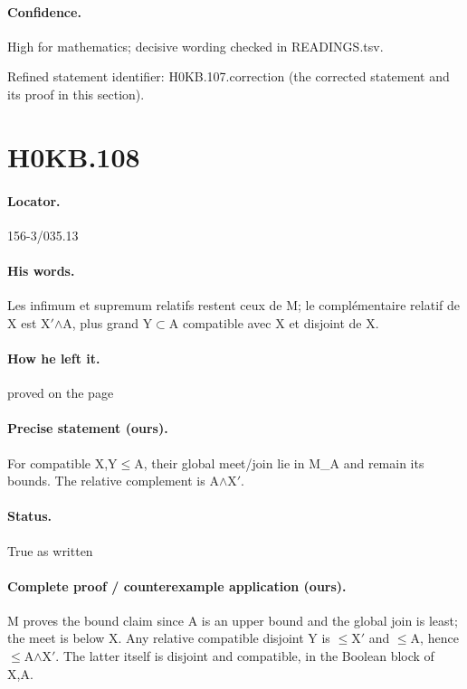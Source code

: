 \paragraph{Confidence.} High for mathematics; decisive wording checked in READINGS.tsv.

\noindent Refined statement identifier: H0KB.107.correction (the corrected statement and its proof in this section).

\section*{H0KB.108}\label{statement:H0KB.108}
\paragraph{Locator.} 156-3/035.13

\paragraph{His words.} Les infimum et supremum relatifs restent ceux de M; le complémentaire relatif de X est X\ensuremath{\prime}\ensuremath{\wedge}A, plus grand Y\ensuremath{\subset}A compatible avec X et disjoint de X.

\paragraph{How he left it.} proved on the page

\paragraph{Precise statement (ours).} For compatible X,Y\ensuremath{\leq}A, their global meet/join lie in M\_A and remain its bounds. The relative complement is A\ensuremath{\wedge}X\ensuremath{\prime}.

\paragraph{Status.} True as written

\paragraph{Complete proof / counterexample application (ours).} M proves the bound claim since A is an upper bound and the global join is least; the meet is below X. Any relative compatible disjoint Y is \ensuremath{\leq}X\ensuremath{\prime} and \ensuremath{\leq}A, hence \ensuremath{\leq}A\ensuremath{\wedge}X\ensuremath{\prime}. The latter itself is disjoint and compatible, in the Boolean block of X,A.

